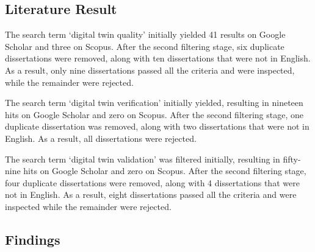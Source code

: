\documentclass{llncs}
\begin{document}
    \subsection*{Literature Result}
    The search term `digital twin quality' initially yielded 41 results on Google Scholar and three on Scopus. 
    After the second filtering stage, six duplicate dissertations were removed, along with ten dissertations that were not in English. As a result, only nine dissertations passed all the criteria and were inspected, while the remainder were rejected.
    
    The search term `digital twin verification' initially yielded, resulting in nineteen hits on Google Scholar and zero on Scopus. After the second filtering stage, one duplicate dissertation was removed, along with two dissertations that were not in English.
    As a result, all dissertations were rejected. 

    The search term `digital twin validation' was filtered initially, resulting in fifty-nine hits on Google Scholar and zero on Scopus. After the second filtering stage, four duplicate dissertations were removed, along with 4 dissertations that were not in English.
    As a result, eight dissertations passed all the criteria and were inspected while the remainder were rejected.

    \subsection*{Findings}
\end{document}
